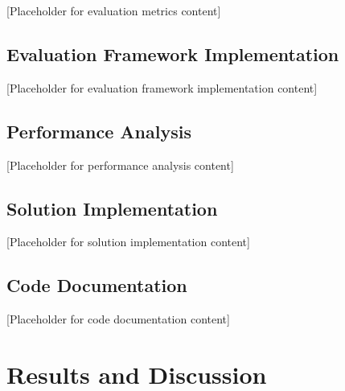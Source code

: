 \documentclass[12pt,a4paper]{article}
\begin{document}

[Placeholder for evaluation metrics content]

\subsection{Evaluation Framework Implementation}


[Placeholder for evaluation framework implementation content]

\subsection{Performance Analysis}


[Placeholder for performance analysis content]


\subsection{Solution Implementation}


[Placeholder for solution implementation content]

\subsection{Code Documentation}


[Placeholder for code documentation content]

\section{Results and Discussion}

\end{document}
